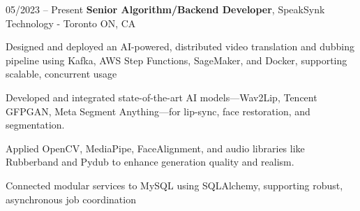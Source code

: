 \begin{twocolentry}{
    05/2023 – Present
}
\fontsize{11 pt}{11 pt}\textbf{Senior Algorithm/Backend Developer}, SpeakSynk Technology - Toronto ON, CA\end{twocolentry}

\vspace{0.10 cm}
\begin{onecolentry}
    \begin{highlights}
        \item Designed and deployed an AI-powered, distributed video translation and dubbing pipeline using Kafka, AWS Step Functions, SageMaker, and Docker, supporting scalable, concurrent usage
        \item Developed and integrated state-of-the-art AI models—Wav2Lip, Tencent GFPGAN, Meta Segment Anything—for lip-sync, face restoration, and segmentation.
        \item Applied OpenCV, MediaPipe, FaceAlignment, and audio libraries like Rubberband and Pydub to enhance generation quality and realism.
        \item Connected modular services to MySQL using SQLAlchemy, supporting robust, asynchronous job coordination
    \end{highlights}
\end{onecolentry}
